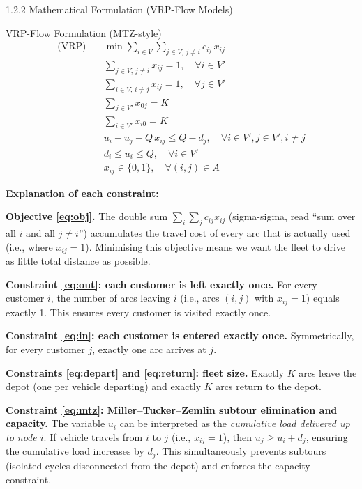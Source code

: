 \documentclass[aspectratio=169,10pt]{beamer}
\begin{document}
\begin{frame}[allowframebreaks]{1.2.2 Mathematical Formulation (VRP-Flow Models)}
\begin{block}{VRP-Flow Formulation (MTZ-style)}
\begin{align}
  \text{(VRP)} \quad & \min \sum_{i \in V} \sum_{j \in V,\, j \neq i} c_{ij}\, x_{ij}
  \tag{1.1} \label{eq:obj}\\[4pt]
  & \sum_{j \in V,\, j \neq i} x_{ij} = 1, \quad \forall i \in V'
  \tag{1.2} \label{eq:out}\\[4pt]
  & \sum_{i \in V,\, i \neq j} x_{ij} = 1, \quad \forall j \in V'
  \tag{1.3} \label{eq:in}\\[4pt]
  & \sum_{j \in V'} x_{0j} = K
  \tag{1.4} \label{eq:depart}\\[4pt]
  & \sum_{i \in V'} x_{i0} = K
  \tag{1.5} \label{eq:return}\\[4pt]
  & u_i - u_j + Q\, x_{ij} \leq Q - d_j, \quad \forall i \in V', j \in V', i \neq j
  \tag{1.6} \label{eq:mtz}\\[4pt]
  & d_i \leq u_i \leq Q, \quad \forall i \in V'
  \tag{1.7} \label{eq:bounds}\\[4pt]
  & x_{ij} \in \{0, 1\}, \quad \forall (i,j) \in A
  \tag{1.8} \label{eq:binary}
\end{align}
\end{block}

\framebreak

\textbf{Explanation of each constraint:}

\textbf{Objective \eqref{eq:obj}.}
The double sum $\sum_i \sum_j c_{ij} x_{ij}$ (sigma-sigma, read ``sum over all $i$
and all $j \neq i$'') accumulates the travel cost of every arc that is actually used
(i.e., where $x_{ij} = 1$).  Minimising this objective means we want the fleet to
drive as little total distance as possible.

\textbf{Constraint \eqref{eq:out}: each customer is left exactly once.}
For every customer $i$, the number of arcs leaving $i$ (i.e., arcs $(i,j)$ with
$x_{ij}=1$) equals exactly 1.  This ensures every customer is visited exactly once.

\textbf{Constraint \eqref{eq:in}: each customer is entered exactly once.}
Symmetrically, for every customer $j$, exactly one arc arrives at $j$.

\textbf{Constraints \eqref{eq:depart} and \eqref{eq:return}: fleet size.}
Exactly $K$ arcs leave the depot (one per vehicle departing) and exactly $K$ arcs
return to the depot.

\textbf{Constraint \eqref{eq:mtz}: Miller--Tucker--Zemlin subtour elimination and capacity.}
The variable $u_i$ can be interpreted as the \emph{cumulative load delivered up to
node $i$}.  If vehicle travels from $i$ to $j$ (i.e., $x_{ij}=1$), then
$u_j \geq u_i + d_j$, ensuring the cumulative load increases by $d_j$.  This
simultaneously prevents subtours (isolated cycles disconnected from the depot) and
enforces the capacity constraint.


\end{frame}
\end{document}
